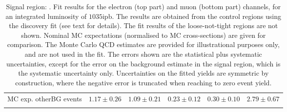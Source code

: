 \begin{table}
\begin{center}
{\begin{tabular*}{\textwidth}{@{\extracolsep{\fill}}lrrrrr}
        MC exp. otherBG events         & $1.17 \pm 0.26$          & $1.09 \pm 0.21$          & $0.23 \pm 0.12$          & $0.30 \pm 0.10$          & $2.79 \pm 0.67$              \\
\noalign{\smallskip}\hline\noalign{\smallskip}
\end{tabular*}
}
\end{center}
\caption{Signal region: . Fit results for the electron (top part) and muon (bottom part) channels, for an integrated luminosity of $1035$ipb.
The results are obtained from the control regions using the discovery fit (see text for details). The fit results of the loose-not-tight regions are not shown.
Nominal MC expectations (normalised to MC cross-sections) are given for comparison. 
The Monte Carlo QCD estimates are provided for illustrational purposes only, and are not used in the fit.
The errors shown are the statistical plus systematic uncertainties, except for the error on the background estimate in the signal region, which is the systematic uncertainty only.
Uncertainties on the fitted yields are symmetric by construction, 
where the negative error is truncated when reaching to zero event yield.
}
\label{table.results.systematics.in.logL.fit.table.results.yields}
\end{table}
%